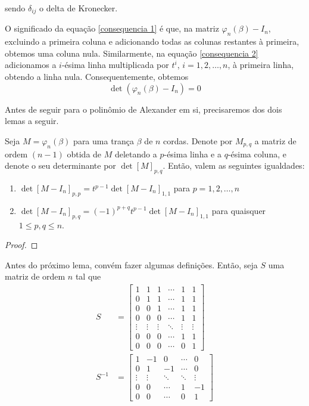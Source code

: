 	\par sendo $\delta_{ij}$ o delta de Kronecker.
	\par\vspace{0.3cm} O significado da equação \eqref{consequencia 1} é que, na matriz $\varphi_n(\beta) - I_n$, excluindo a primeira coluna e adicionando todas as colunas restantes à primeira, obtemos uma coluna nula. Similarmente, na equação \eqref{consequencia 2} adicionamos a $i$-ésima linha multiplicada por $t^i$, $i=1,2,\dots,n$, à primeira linha, obtendo a linha nula. Consequentemente, obtemos
	\begin{equation*}
	\det(\varphi_n(\beta) - I_n) = 0
	\end{equation*}
	\par\vspace{0.3cm} Antes de seguir para o polinômio de Alexander em si, precisaremos dos dois lemas a seguir.
	\begin{lemma}
		\label{exercicio}
		Seja $M = \varphi_n(\beta)$ para uma trança $\beta$ de $n$ cordas. Denote por $M_{p,q}$ a matriz de ordem $(n-1)$ obtida de $M$ deletando a $p$-ésima linha e a $q$-ésima coluna, e denote o seu determinante por $\det[M]_{p,q}$. Então, valem as seguintes igualdades:
		\begin{enumerate}
			\item $\det[M - I_n]_{p,p} = t^{p-1}\det[M - I_n]_{1,1}$ para $p=1,2,\dots,n$
			\item $\det[M - I_n]_{p,q} = (-1)^{p+q}t^{p-1}\det[M - I_n]_{1,1}$ para quaisquer $1\leq p,q\leq n$.
		\end{enumerate}
	\end{lemma}
	\begin{proof}
		
	\end{proof}
	\par\vspace{0.3cm} Antes do próximo lema, convém fazer algumas definições. Então, seja $S$ uma matriz de ordem $n$ tal que
	\begin{align*}
	S &= \begin{bmatrix}
	1 & 1 & 1 & \cdots & 1 & 1 \\
	0 & 1 & 1 & \cdots & 1 & 1 \\
	0 & 0 & 1 & \cdots & 1 & 1 \\
	0 & 0 & 0 & \cdots & 1 & 1 \\
	\vdots & \vdots & \vdots & \ddots & \vdots & \vdots \\
	0 & 0 & 0 & \cdots & 1 & 1 \\
	0 & 0 & 0 & \cdots & 0 & 1
	\end{bmatrix}\\
	S^{-1} &= \begin{bmatrix}
	1 & -1 & 0 & \cdots & 0\\
	0 & 1  & -1 & \cdots & 0\\
	\vdots & \vdots & \ddots & \ddots & \vdots \\
	0 & 0 & \cdots & 1 & -1 \\
	0 & 0 & \cdots & 0 & 1
	\end{bmatrix}
	\end{align*}
